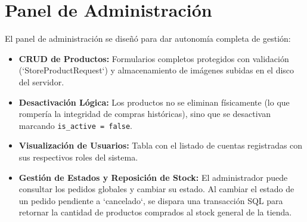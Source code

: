 \section{Panel de Administración}
El panel de administración se diseñó para dar autonomía completa de gestión:
\begin{itemize}
    \item \textbf{CRUD de Productos:} Formularios completos protegidos con validación (`StoreProductRequest`) y almacenamiento de imágenes subidas en el disco del servidor.
    \item \textbf{Desactivación Lógica:} Los productos no se eliminan físicamente (lo que rompería la integridad de compras históricas), sino que se desactivan marcando \texttt{is\_active = false}.
    \item \textbf{Visualización de Usuarios:} Tabla con el listado de cuentas registradas con sus respectivos roles del sistema.
    \item \textbf{Gestión de Estados y Reposición de Stock:} El administrador puede consultar los pedidos globales y cambiar su estado. Al cambiar el estado de un pedido pendiente a `cancelado`, se dispara una transacción SQL para retornar la cantidad de productos comprados al stock general de la tienda.
\end{itemize}
